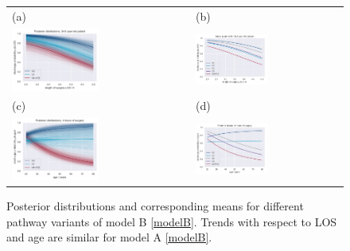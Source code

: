 \begin{figure}
    \centering
    \begin{tabular}{ll}
(a)  & (b) \\
\includegraphics[width=0.5\textwidth]{images/DS19fk1_c0__p_LoS__model_B__traces_V0_V4-12__age_mean.png}&
\includegraphics[width=0.5\textwidth]{images/DS19fk1_c0__p_LoS__model_B__mean__age_mean.pdf}\\
(c) & (d) \\
\includegraphics[width=0.5\textwidth]{images/DS19fk1_c0__p_age__model_B__traces__LoS_4h.png}&
\includegraphics[width=0.5\textwidth]{images/DS19fk1_c0__p_age__model_B__mean__LoS_4h.pdf}\\
\end{tabular}
    \caption{Posterior distributions and corresponding means for
      different pathway variants of model B \eqref{modelB}. Trends with respect to
      LOS and age are similar for model A \eqref{modelB}.}
    \label{fig:posterior}
\end{figure}

